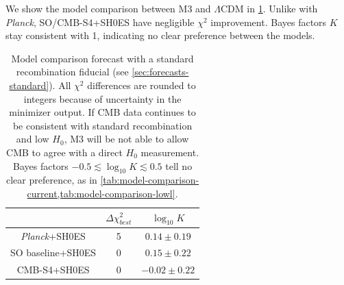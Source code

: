 We show the model comparison between M3 and $\Lambda$CDM in \cref{tab:model-comparison-forecast-standard}.
Unlike with {\it Planck}, SO/CMB-S4+SH0ES have negligible $\chi^2$ improvement.
Bayes factors $K$ stay consistent with 1, indicating no clear preference between the models.

\begin{table}[ht!]
\centering
\begin{tabular}{|c|c|c|}
\hline
 & $\Delta \chi^2_{best}$ & $\log_{10} K$ \\
\hline
{\it Planck}+SH0ES & 5 & $0.14\pm 0.19$ \\
\hline
SO baseline+SH0ES & 0 & $0.15\pm 0.22$ \\
CMB-S4+SH0ES & 0 & $-0.02\pm 0.22$ \\
\hline
\end{tabular}
\caption[Clumping vs standard model comparison forecast with a standard recombination fiducial]{Model comparison forecast with a standard recombination fiducial (see \cref{sec:forecasts-standard}).
All $\chi^2$ differences are rounded to integers because of uncertainty in the minimizer output.
If CMB data continues to be consistent with standard recombination and low $H_0$, M3 will be not able to allow CMB to agree with a direct $H_0$ measurement.
Bayes factors $-0.5\lesssim\log_{10}K\lesssim 0.5$ tell no clear preference, as in \cref{tab:model-comparison-current,tab:model-comparison-lowl}.}
\label{tab:model-comparison-forecast-standard}
\end{table}

